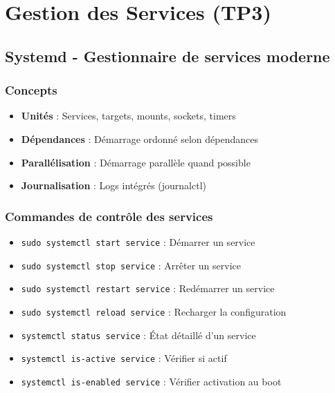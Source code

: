 \documentclass[12pt,a4paper]{article}
\begin{document}

\section{Gestion des Services (TP3)}

\subsection{Systemd - Gestionnaire de services moderne}

\subsubsection{Concepts}
\begin{itemize}
    \item \textbf{Unités} : Services, targets, mounts, sockets, timers
    \item \textbf{Dépendances} : Démarrage ordonné selon dépendances
    \item \textbf{Parallélisation} : Démarrage parallèle quand possible
    \item \textbf{Journalisation} : Logs intégrés (journalctl)
\end{itemize}

\subsubsection{Commandes de contrôle des services}
\begin{itemize}
    \item \texttt{sudo systemctl start service} : Démarrer un service
    \item \texttt{sudo systemctl stop service} : Arrêter un service
    \item \texttt{sudo systemctl restart service} : Redémarrer un service
    \item \texttt{sudo systemctl reload service} : Recharger la configuration
    \item \texttt{systemctl status service} : État détaillé d'un service
    \item \texttt{systemctl is-active service} : Vérifier si actif
    \item \texttt{systemctl is-enabled service} : Vérifier activation au boot
\end{itemize}
\end{document}
